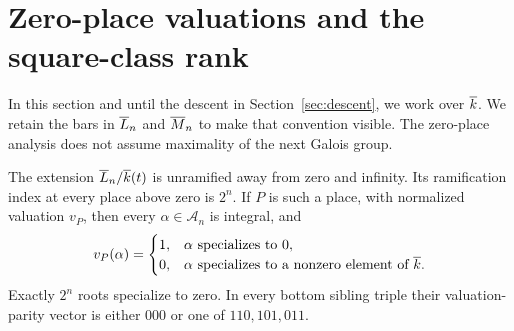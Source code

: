 \section{Zero-place valuations and the square-class rank}\label{sec:kummer}

In this section and until the descent in Section~\ref{sec:descent},
we work over $\overline{k}$. We retain the bars in $\overline{L}_n$ and $\overline{M}_n$
to make that convention visible. The zero-place analysis does not
assume maximality of the next Galois group.

\begin{lemma}\label{lem:zero}
The extension $\overline{L}_n/\overline{k}(t)$ is unramified away from zero and
infinity. Its ramification index at every place above zero is $2^n$.
If $P$ is such a place, with normalized valuation $v_P$, then
every $\alpha\in\mathcal A_n$ is integral, and
\begin{equation}\label{eq:zero-valuations}
 v_P(\alpha)=
 \begin{cases}
 1,&\alpha\text{ specializes to }0,\\
 0,&\alpha\text{ specializes to a nonzero element of }\overline{k}.
 \end{cases}
\end{equation}
Exactly $2^n$ roots specialize to zero. In every bottom sibling
triple their valuation-parity vector is either $000$ or one of
$110,101,011$.
\end{lemma}

